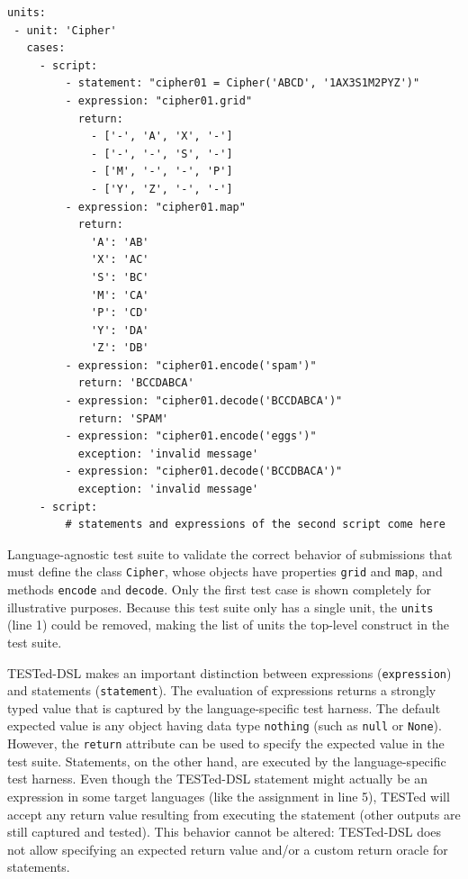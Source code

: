 \documentclass[../main]{subfiles}
\begin{document}
\begin{listing}
    \begin{verbatim}
units:
 - unit: 'Cipher'
   cases:
     - script:
         - statement: "cipher01 = Cipher('ABCD', '1AX3S1M2PYZ')"
         - expression: "cipher01.grid"
           return:
             - ['-', 'A', 'X', '-']
             - ['-', '-', 'S', '-']
             - ['M', '-', '-', 'P']
             - ['Y', 'Z', '-', '-']
         - expression: "cipher01.map"
           return:
             'A': 'AB'
             'X': 'AC'
             'S': 'BC'
             'M': 'CA'
             'P': 'CD'
             'Y': 'DA'
             'Z': 'DB'
         - expression: "cipher01.encode('spam')"
           return: 'BCCDABCA'
         - expression: "cipher01.decode('BCCDABCA')"
           return: 'SPAM'
         - expression: "cipher01.encode('eggs')"
           exception: 'invalid message'
         - expression: "cipher01.decode('BCCDBACA')"
           exception: 'invalid message'
     - script:
         # statements and expressions of the second script come here
    \end{verbatim}
    \caption[]{
        Language-agnostic test suite to validate the correct behavior of submissions that must define the class \texttt{Cipher}, whose objects have properties \texttt{grid} and \texttt{map}, and methods \texttt{encode} and \texttt{decode}. Only the first test case is shown completely for illustrative purposes. Because this test suite only has a single unit, the \texttt{units} (line 1) could be removed, making the list of units the top-level construct in the test suite.
    }
    \label{lst:cipher-example}
\end{listing}

TESTed-DSL makes an important distinction between expressions (\texttt{expression}) and statements (\texttt{statement}).
The evaluation of expressions returns a strongly typed value that is captured by the language-specific test harness.
The default expected value is any object having data type \texttt{nothing} (such as \texttt{null} or \texttt{None}).
However, the \texttt{return} attribute can be used to specify the expected value in the test suite.
Statements, on the other hand, are executed by the language-specific test harness.
Even though the TESTed-DSL statement might actually be an expression in some target languages (like the assignment in line 5),
TESTed will accept any return value resulting from executing the statement (other outputs are still captured and tested).
This behavior cannot be altered: TESTed-DSL does not allow specifying an expected return value and/or a custom return oracle for statements.
\end{document}
